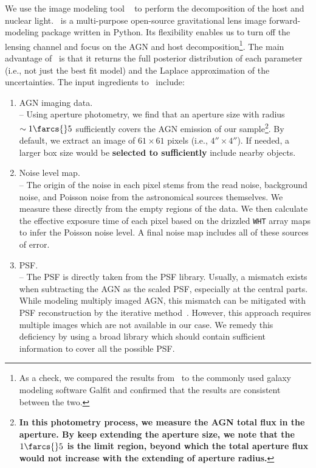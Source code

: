 \documentclass[apj]{emulateapj}
\begin{document}
We use the image modeling tool \lenstronomy~\citep{Birrer2015, lenstronomy} to perform the decomposition of the host and nuclear light. \lenstronomy\ is a multi-purpose open-source gravitational lens image forward-modeling package written in Python. 
Its flexibility enables us to turn off the lensing channel and focus on the AGN and host decomposition\footnote{As a check, we compared the results from \lenstronomy\ to the commonly used galaxy modeling software {\sc Galfit} and confirmed that the results are consistent between the two.}. The main advantage of \lenstronomy\ is that it returns the full posterior distribution of each parameter (i.e., not just the best fit model) and the Laplace approximation of the uncertainties. The input ingredients to \lenstronomy\ include:
\begin{enumerate}
\item AGN imaging data. \\
-- Using aperture photometry, we find that an aperture size with radius $\sim1\farcs{}5$ sufficiently covers the AGN emission of our sample\footnote{\bf In this photometry process, we measure the AGN total flux in the aperture. By keep extending the aperture size, we note that the $1\farcs{}5$ is the limit region, beyond which the total aperture flux would not increase with the extending of aperture radius.}. By default, we extract an image of $61\times61$ pixels (i.e., $4''\times 4''$). If needed, a larger box size would be {\bf selected to sufficiently} include nearby objects. 
\item Noise level map.\\
-- The origin of the noise in each pixel stems from the read noise, background noise, and Poisson noise from the astronomical sources themselves. We measure these directly from the empty regions of the data. We then calculate the effective exposure time of each pixel based on the drizzled \texttt{WHT} array maps to infer the Poisson noise level. A final noise map includes all of these sources of error. 
  
\item PSF. \\
-- The PSF is directly taken from the PSF library. Usually, a mismatch exists when subtracting the AGN as the scaled PSF, especially at the central parts. While modeling multiply imaged AGN, this mismatch can be mitigated with PSF reconstruction by the iterative method~\citep{Chen2016, Birrer2018}.  However, this approach requires multiple images which are not available in our case.  We remedy this deficiency by using a broad library which should contain sufficient information to cover all the possible PSF. 
\end{enumerate}
\end{document}
